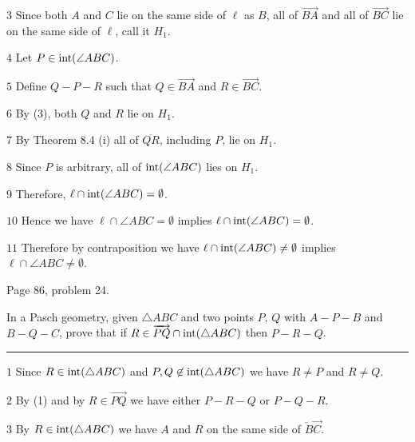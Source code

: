 \medskip
\item{$\scriptstyle3$}
Since both $A$ and $C$ lie on the same side of $\ell$ as $B$, all of
$\overrightarrow{BA}$
and all of
$\overrightarrow{BC}$
lie on the same side of $\ell$, call it $H_1$.

\medskip
\item{$\scriptstyle4$}
Let $P\in\mathop{\rm int}\nolimits(\angle ABC)$.

\medskip
\item{$\scriptstyle5$}
Define $Q{-}P{-}R$ such that $Q\in\overrightarrow{BA}$
and $R\in\overrightarrow{BC}$.

\medskip
\item{$\scriptstyle6$}
By (3), both $Q$ and $R$ lie on $H_1$.

\medskip
\item{$\scriptstyle7$}
By Theorem 8.4 (i) all of $\overline{QR}$, including $P$, lie on $H_1$.

\medskip
\item{$\scriptstyle8$}
Since $P$ is arbitrary, all of $\mathop{\rm int}\nolimits(\angle ABC)$ lies on $H_1$.

\medskip
\item{$\scriptstyle9$}
Therefore, $\ell\cap\mathop{\rm int}\nolimits(\angle ABC)=\emptyset$.

\medskip
\item{$\scriptstyle10$}
Hence we have $\ell\cap\angle ABC=\emptyset$ implies $\ell\cap\mathop{\rm int}\nolimits(\angle ABC)=\emptyset$.

\medskip
\item{$\scriptstyle11$}
Therefore by contraposition we have $\ell\cap\mathop{\rm int}\nolimits(\angle ABC)\ne\emptyset$
implies $\ell\cap\angle ABC\ne\emptyset$.

\vfill
\eject

\beginsection Page 86, problem 24.

In a Pasch geometry, given $\triangle ABC$ and two points $P$, $Q$ with $A{-}P{-}B$
and $B{-}Q{-}C$, prove that if $R\in\overrightarrow{PQ}\cap\mathop{\rm int}\nolimits(\triangle ABC)$
then $P{-}R{-}Q$.

\medskip
\hrule

\bigskip
\item{$\scriptstyle1$}
Since $R\in\mathop{\rm int}\nolimits(\triangle ABC)$ and $P,Q\not\in\mathop{\rm int}\nolimits(\triangle ABC)$
we have $R\ne P$ and $R\ne Q$.

\medskip
\item{$\scriptstyle2$}
By (1) and by $R\in\overrightarrow{PQ}$ we have either $P{-}R{-}Q$ or $P{-}Q{-}R$.

\medskip
\item{$\scriptstyle3$}
By $R\in\mathop{\rm int}\nolimits(\triangle ABC)$ we have $A$ and $R$ on the same side of
$\overleftarrow B\overrightarrow C$.


